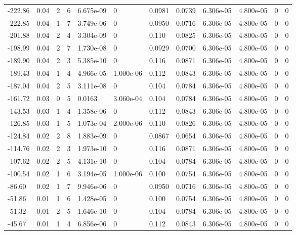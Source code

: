 \documentclass[preview]{standalone}
\begin{document}
{{\begin{tabular}{L{1.2cm}C{1.2cm} C{0.3cm}C{0.5cm} C{1.4cm}C{1.4cm} C{1.4cm}C{1.4cm} C{1.6cm}C{1.6cm} C{1.6cm}C{1.6cm}}
  -222.86  &  0.04  & 2     &  6 &  6.675e-09  & 0  &  0.0981&   0.0739& 6.306e-05 & 4.800e-05   &  0 & 0  \\ 
  -222.85  &  0.04  & 1     &  7 &  3.749e-06  & 0  &  0.0950&   0.0716& 6.306e-05 & 4.800e-05   &  0 & 0  \\ 
  -201.88  &  0.04  & 2     &  4 &  3.304e-09  & 0  &  0.110&   0.0825& 6.306e-05 & 4.800e-05   &  0 & 0  \\ 
  -198.99  &  0.04  & 2     &  7 &  1.730e-08  & 0  &  0.0929&   0.0700& 6.306e-05 & 4.800e-05   &  0 & 0  \\ 
  -189.90  &  0.04  & 2     &  3 &  5.385e-10  & 0  &  0.116&   0.0871& 6.306e-05 & 4.800e-05   &  0 & 0  \\ 
  -189.43  &  0.04  & 1     &  4 &  4.966e-05  & 1.000e-06  &  0.112&   0.0843& 6.306e-05 & 4.800e-05   &  0 & 0  \\ 
  -187.04  &  0.04  & 2     &  5 &  3.111e-08  & 0  &  0.104&   0.0784& 6.306e-05 & 4.800e-05   &  0 & 0  \\ 
  -161.72  &  0.03  & 0     &  5 &  0.0163  & 3.060e-04  &  0.104&   0.0784& 6.306e-05 & 4.800e-05   &  0 & 0  \\ 
  -143.53  &  0.03  & 1     &  4 &  1.358e-06  & 0  &  0.112&   0.0843& 6.306e-05 & 4.800e-05   &  0 & 0  \\ 
  -126.85  &  0.03  & 1     &  5 &  1.073e-04  & 2.000e-06  &  0.110&   0.0826& 6.306e-05 & 4.800e-05   &  0 & 0  \\ 
  -124.84  &  0.02  & 2     &  8 &  1.883e-09  & 0  &  0.0867&   0.0654& 6.306e-05 & 4.800e-05   &  0 & 0  \\ 
  -114.76  &  0.02  & 2     &  3 &  1.973e-10  & 0  &  0.116&   0.0871& 6.306e-05 & 4.800e-05   &  0 & 0  \\ 
  -107.62  &  0.02  & 2     &  5 &  4.131e-10  & 0  &  0.104&   0.0784& 6.306e-05 & 4.800e-05   &  0 & 0  \\ 
  -100.54  &  0.02  & 1     &  6 &  3.194e-05  & 1.000e-06  &  0.100&   0.0754& 6.306e-05 & 4.800e-05   &  0 & 0  \\ 
  -86.60  &  0.02  & 1     &  7 &  9.946e-06  & 0  &  0.0950&   0.0716& 6.306e-05 & 4.800e-05   &  0 & 0  \\ 
  -51.86  &  0.01  & 1     &  6 &  1.428e-05  & 0  &  0.100&   0.0754& 6.306e-05 & 4.800e-05   &  0 & 0  \\ 
  -51.32  &  0.01  & 2     &  5 &  1.646e-10  & 0  &  0.104&   0.0784& 6.306e-05 & 4.800e-05   &  0 & 0  \\ 
  -45.67  &  0.01  & 1     &  4 &  6.856e-06  & 0  &  0.112&   0.0843& 6.306e-05 & 4.800e-05   &  0 & 0  \\ 

\end{tabular}}}
\end{document}
